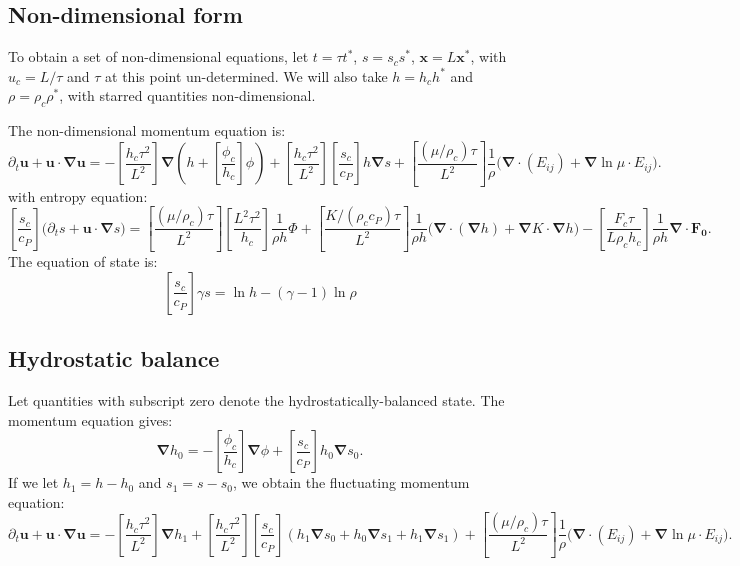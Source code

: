 \documentclass{aastex631}
\newcommand{\del}{\nabla}
\renewcommand{\vec}{\boldsymbol}
\newcommand{\grad}{\vec{\del}}
\begin{document}
\newpage
\subsection{Non-dimensional form}
To obtain a set of non-dimensional equations, let $t = \tau t^*$, $s = s_c s^*$, $\vec{x} = L \vec{x^*}$, with $u_c = L/\tau$ and $\tau$ at this point un-determined.  We will also take $h = h_c h^*$ and $\rho = \rho_c \rho^*$, with starred quantities non-dimensional.

The non-dimensional momentum equation is:
\begin{equation}
  \partial_t \vec{u} + \vec{u}\cdot\grad\vec{u} =
  -\left[\frac{h_c \tau^2}{L^2}\right]\grad \left(h + \left[\frac{\phi_c}{h_c}\right]\phi\right)
  + \left[\frac{h_c \tau^2}{L^2}\right] \left[\frac{s_c}{c_P}\right]h\grad s + \left[\frac{(\mu/\rho_c) \tau}{L^2}\right]\frac{1}{\rho} \Bigg(\grad \cdot (E_{ij}) + \grad \ln \mu \cdot E_{ij}\Bigg).
\end{equation}
with entropy equation:
\begin{equation}
  \left[\frac{s_c}{c_P}\right]\Bigg(\partial_t s + \vec{u}\cdot\grad s\Bigg) =
  \left[\frac{(\mu/\rho_c)\tau}{L^2}\right]\left[\frac{L^2 \tau^2}{h_c}\right]\frac{1}{\rho h} \Phi
  + \left[\frac{K/(\rho_c c_P)\tau}{L^2}\right] \frac{1}{\rho h}\Bigg(\grad\cdot(\grad h) + \grad K \cdot \grad h \Bigg)
  - \left[\frac{F_c \tau}{L \rho_c h_c}\right]\frac{1}{\rho h}\grad\cdot\vec{F_0}.
\end{equation}
The equation of state is:
\begin{equation}
  \left[\frac{s_c}{c_P}\right] \gamma s = \ln h - (\gamma - 1)\ln \rho
\end{equation}

\subsection{Hydrostatic balance}
Let quantities with subscript zero denote the hydrostatically-balanced state.  The momentum equation gives:
\begin{equation}
  \grad h_0 =
  - \left[\frac{\phi_c}{h_c}\right]\grad\phi
  + \left[\frac{s_c}{c_P}\right]h_0\grad s_0.
\end{equation}
If we let $h_1 = h - h_0$ and $s_1 = s - s_0$, we obtain the fluctuating momentum equation:
\begin{equation}
  \partial_t \vec{u} + \vec{u}\cdot\grad\vec{u} =
  -\left[\frac{h_c \tau^2}{L^2}\right]\grad h_1
  + \left[\frac{h_c \tau^2}{L^2}\right] \left[\frac{s_c}{c_P}\right]\left(h_1\grad s_0 + h_0\grad s_1 + h_1 \grad s_1\right) + \left[\frac{(\mu/\rho_c) \tau}{L^2}\right]\frac{1}{\rho} \Bigg(\grad \cdot (E_{ij}) + \grad \ln \mu \cdot E_{ij}\Bigg).
\end{equation}
\end{document}
